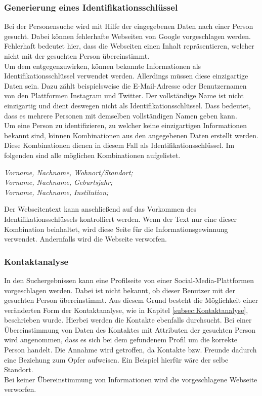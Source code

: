 		\subsubsection{Generierung eines Identifikationsschlüssel}
		\label{subsubsec:VorlaeufigInhaltskontrolle}
		Bei der Personensuche wird mit Hilfe der eingegebenen Daten nach einer Person gesucht. Dabei können fehlerhafte Webseiten von Google vorgeschlagen werden. Fehlerhaft bedeutet hier, dass die Webseiten einen Inhalt repräsentieren, welcher nicht mit der gesuchten Person übereinstimmt.\\ 
		Um dem entgegenzuwirken, können bekannte Informationen als Identifikationsschlüssel verwendet werden. Allerdings müssen diese einzigartige Daten sein. Dazu zählt beispielsweise die E-Mail-Adresse oder Benutzernamen von den Plattformen Instagram und Twitter. Der vollständige Name ist nicht einzigartig und dient deswegen nicht als Identifikationsschlüssel. Dass bedeutet, dass es mehrere Personen mit demselben vollständigen Namen geben kann.\\
		Um eine Person zu identifizieren, zu welcher keine einzigartigen Informationen bekannt sind, können Kombinationen aus den angegebenen Daten erstellt werden. Diese Kombinationen dienen in diesem Fall als Identifikationsschlüssel. Im folgenden sind alle möglichen Kombinationen aufgelistet.
		
		\textit{Vorname, Nachname, Wohnort/Standort;}\\
		\textit{Vorname, Nachname, Geburtsjahr;}\\
		\textit{Vorname, Nachname, Institution;}
		
		Der Webseitentext kann anschließend auf das Vorkommen des Identifikationsschlüssels kontrolliert werden. Wenn der Text nur eine dieser Kombination beinhaltet, wird diese Seite für die Informationsgewinnung verwendet. Andernfalls wird die Webseite verworfen.\\

		\subsubsection{Kontaktanalyse}	
		In den Suchergebnissen kann eine Profilseite von einer Social-Media-Plattformen vorgeschlagen werden. Dabei ist nicht bekannt, ob dieser Benutzer mit der gesuchten Person übereinstimmt. Aus diesem Grund besteht die Möglichkeit einer veränderten Form der Kontaktanalyse, wie in Kapitel \ref{subsec:Kontaktanalyse}, beschrieben wurde. Hierbei werden die Kontakte ebenfalls durchsucht. Bei einer Übereinstimmung von Daten des Kontaktes mit Attributen der gesuchten Person wird angenommen, dass es sich bei dem gefundenem Profil um die korrekte Person handelt. Die Annahme wird getroffen, da Kontakte bzw. Freunde dadurch eine Beziehung zum Opfer aufweisen. Ein Beispiel hierfür wäre der selbe Standort.\\
		Bei keiner Übereinstimmung von Informationen wird die vorgeschlagene Webseite verworfen.	

